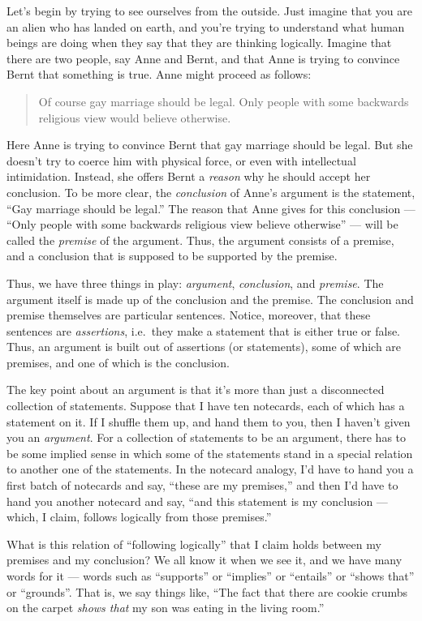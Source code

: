 Let's begin by trying to see ourselves from the outside.  Just imagine
that you are an alien who has landed on earth, and you're trying to
understand what human beings are doing when they say that they are
thinking logically.  Imagine that there are two people, say Anne and
Bernt, and that Anne is trying to convince Bernt that something is
true.  Anne might proceed as follows:
\begin{quote}
  Of course gay marriage should be legal.  Only people with some
  backwards religious view would believe otherwise. \end{quote} Here
Anne is trying to convince Bernt that gay marriage should be legal.
But she doesn't try to coerce him with physical force, or even with
intellectual intimidation.  Instead, she offers Bernt a
\textit{reason} why he should accept her conclusion.  To be more
clear, the \emph{conclusion} of Anne's argument is
the statement, ``Gay marriage should be legal.''  The reason that Anne
gives for this conclusion --- ``Only people with some backwards
religious view believe otherwise'' --- will be called the
\emph{premise} of the argument.  Thus, the argument
consists of a premise, and a conclusion that is supposed to be
supported by the premise.

Thus, we have three things in play: \emph{argument},
\emph{conclusion}, and \emph{premise}.  The argument itself is made up
of the conclusion and the premise.  The conclusion and premise
themselves are particular sentences.  Notice, moreover, that these
sentences are \textit{assertions}, i.e.\ they make a statement that is
either true or false.  Thus, an argument is built out of assertions
(or statements), some of which are premises, and one of which is the
conclusion.

The key point about an argument is that it's more than just a
disconnected collection of statements.  Suppose that I have ten
notecards, each of which has a statement on it.  If I shuffle them up,
and hand them to you, then I haven't given you an \emph{argument}.
For a collection of statements to be an argument, there has to be some
implied sense in which some of the statements stand in a special
relation to another one of the statements.  In the notecard analogy,
I'd have to hand you a first batch of notecards and say, ``these are
my premises,'' and then I'd have to hand you another notecard and say,
``and this statement is my conclusion --- which, I claim, follows
logically from those premises.''

What is this relation of ``following logically'' that I claim holds
between my premises and my conclusion?  We all know it when we see it,
and we have many words for it --- words such as ``supports'' or
``implies'' or ``entails'' or ``shows that'' or ``grounds''.  That is,
we say things like, ``The fact that there are cookie crumbs on the
carpet \textit{shows that} my son was eating in the living room.''

